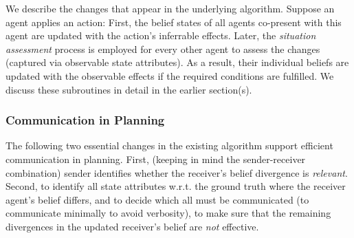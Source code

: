 \documentclass[letterpaper]{article} %
\begin{document}
We describe the changes that appear in the underlying algorithm. Suppose an agent applies an action: First, the belief states of all agents co-present with this agent are updated with the action's inferrable effects. Later, the \textit{situation assessment} process is employed for every other agent to assess the changes (captured via observable state attributes). As a result, their individual beliefs are updated with the observable effects if the required conditions are fulfilled. We discuss these subroutines in detail in the earlier section(s).

\subsubsection{Communication in Planning}
The following two essential changes in the existing algorithm support efficient communication in planning. 
First, (keeping in mind the sender-receiver combination) sender identifies whether the receiver's belief divergence is \textit{relevant}. 
Second, to identify all state attributes w.r.t. the ground truth where the receiver agent's belief differs, and to decide which all must be communicated (to communicate minimally to avoid verbosity), to make sure that the remaining divergences in the updated receiver's belief are \textit{not} effective. 

\end{document}
